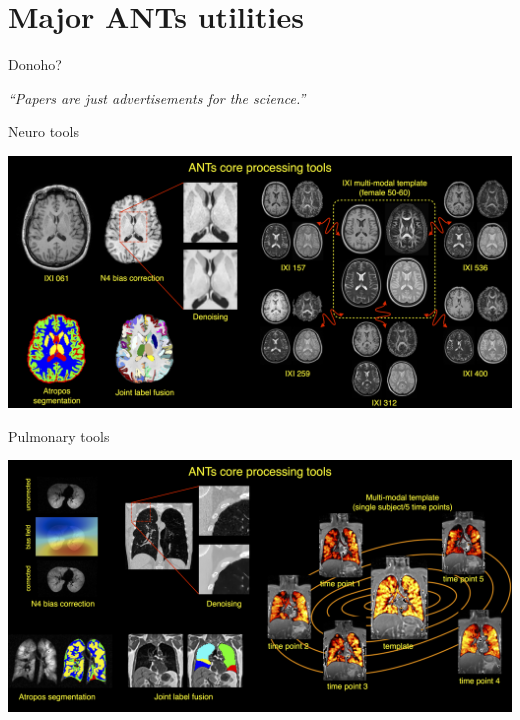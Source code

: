\documentclass[ignorenonframetext,]{beamer}
\begin{document}
\section{Major ANTs utilities}\label{major-ants-utilities}

\begin{frame}{Donoho?}

 \emph{``Papers are just advertisements for the science.''}

\end{frame}

\begin{frame}{Neuro tools}

\includegraphics{./tools/figures/coreANtsToolsNeuro.png}

\end{frame}

\begin{frame}{Pulmonary tools}

\includegraphics{./tools/figures/coreANtsToolsLung.png}

\end{frame}
\end{document}
